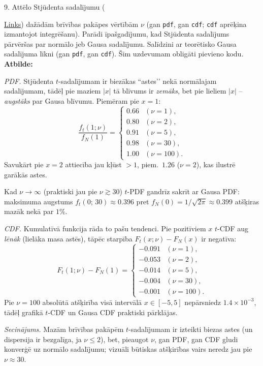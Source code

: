 \documentclass[12pt]{article}
\begin{document}
9. Attēlo Stjūdenta sadalījumu ({\href{https://en.wikipedia.org/wiki/Student%27s_t-distribution}{Links}) dažādām brīvības pakāpes vērtībām $\nu$ (gan \texttt{pdf}, gan \texttt{cdf}; \texttt{cdf} aprēķina izmantojot integrēšanu). Parādi īpašgadījumu, kad Stjūdenta sadalījums pārvēršas par normālo jeb Gausa sadalījumu. Salīdzini ar teorētisko Gausa sadalījuma līkni (gan \texttt{pdf}, gan \texttt{cdf}). Šim uzdevumam obligāti pievieno kodu.\\

\textbf{Atbilde:}

\emph{PDF.}  
Stjūdenta $t$-sadalījumam ir biezākas “astes’’ nekā normālajam
sadalījumam, tādēļ pie maziem $|x|$ tā blīvums ir \emph{zemāks},
bet pie lieliem $|x|$ – \emph{augstāks} par Gausa blīvumu.
Piemēram pie $x=1$:
\[
\frac{f_{t}(1;\nu)}{f_{N}(1)}=
\begin{cases}
0.66 & (\nu=1),\\
0.80 & (\nu=2),\\
0.91 & (\nu=5),\\
0.98 & (\nu=30),\\
1.00 & (\nu=100).
\end{cases}
\]
Savukārt pie $x=2$ attiecība jau kļūst $>1$, piem.\ $1.26$ ($\nu=2$),
kas ilustrē garākās astes.

Kad $\nu\!\to\!\infty$ (praktiski jau pie $\nu\gtrsim30$)
$t$-PDF gandrīz sakrīt ar Gausa PDF: maksimuma augstums  
$f_{t}(0;\,30)\approx0.396$ pret $f_{N}(0)=1/\sqrt{2\pi}\approx0.399$  
atšķiras mazāk nekā par $1\%$.

\emph{CDF.}  
Kumulatīvā funkcija rāda to pašu tendenci.
Pie pozitīviem $x$ $t$-CDF aug \emph{lēnāk} (lielāka masa astēs),
tāpēc starpība $F_{t}(x;\nu)-F_{N}(x)$ ir negatīva:
\[
F_{t}(1;\nu)-F_{N}(1)=
\begin{cases}
-0.091 & (\nu=1),\\
-0.053 & (\nu=2),\\
-0.014 & (\nu=5),\\
-0.004 & (\nu=30),\\
-0.001 & (\nu=100).
\end{cases}
\]
Pie $\nu=100$ absolūtā atšķirība visā intervālā $x\in[-5,5]$
nepārsniedz $1.4\times10^{-3}$, tādēļ grafikā $t$-CDF un Gausa CDF
praktiski pārklājas.

\emph{Secinājums.}  
Mazām brīvības pakāpēm $t$-sadalījumam ir izteikti biezas astes
(un dispersija ir bezgalīga, ja $\nu\le 2$),
bet, pieaugot $\nu$, gan PDF, gan CDF gludi konverģē
uz normālo sadalījumu; vizuāli būtiskas atšķirības vairs
neredz jau pie $\nu\approx30$.
\\

}
\end{document}
